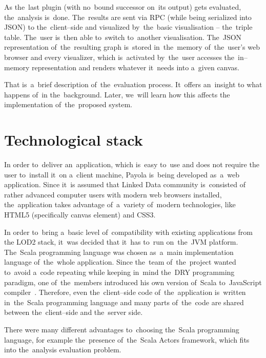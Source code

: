 As the~last plugin (with no~bound successor on~its output) gets evaluated, the~analysis is~done. The~results are sent via RPC (while being serialized into JSON) 
to the~client--side and visualized by~the~basic visualisation -- the~triple 
table. The~user is~then able to~switch to~another visualisation. The~JSON 
representation of~the~resulting graph is~stored in~the~memory of~the~user's web 
browser and every visualizer, which is~activated by~the~user accesses the~in--memory representation and renders whatever it~needs into a~given canvas.

That is~a~brief description of~the~evaluation process. It~offers an~insight
to what happens of~in the~background. Later, we~will learn how this affects 
the implementation of~the~proposed system.

\section{Technological stack}
In order to~deliver an~application, which is~easy to~use and does not require 
the user to~install it~on a~client machine, Payola is~being developed as~a~web
application. Since it~is assumed that Linked Data community is~consisted of
rather advanced computer users with modern web browsers installed, the~application 
takes advantage of~a~variety of~modern technologies, like HTML5 (specifically
canvas element) and CSS3.

In order to~bring a~basic level of~compatibility with existing applications from 
the LOD2 stack, it~was decided that it~has to~run on~the~JVM platform. The~Scala programming language was chosen as~a~main implementation language of~the~whole application. Since the~team of~the~project wanted to~avoid a~code repeating 
while keeping in~mind the~DRY programming paradigm, one of~the~members 
introduced his own version of~Scala to~JavaScript compiler~\cite{s2js}. Therefore, even the~client--side code of~the~application is~written in~the~Scala programming language 
and many parts of~the~code are shared between the~client--side and the~server 
side.

There were many different advantages to~choosing the~Scala programming language, 
for example the~presence of~the~Scala Actors framework, which fits into the~analysis evaluation problem.

